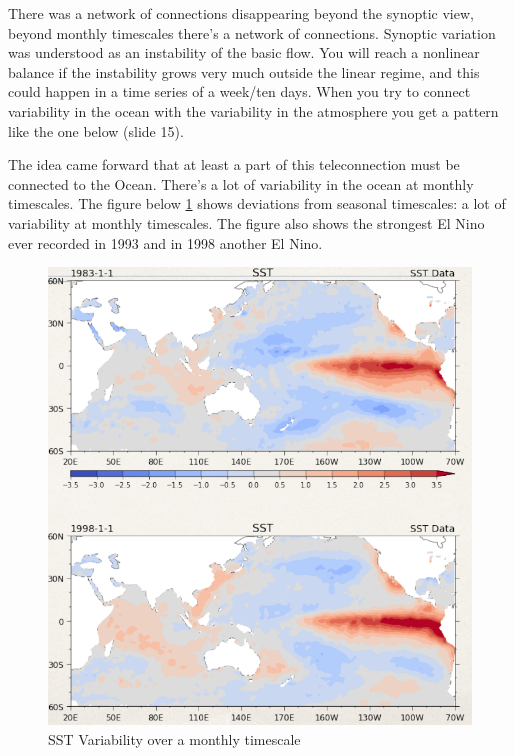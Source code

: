 There was a network of connections disappearing beyond the synoptic view, beyond monthly timescales there's a network of connections. Synoptic variation was understood as an instability of the basic flow. You will reach a nonlinear balance if the instability grows very much outside the linear regime, and this could happen in a time series of a week/ten days.
When you try to connect variability in the ocean with the variability in the atmosphere you get a pattern like the one below (slide 15).

The idea came forward that at least a part of this teleconnection must be connected to the Ocean. There's a lot of variability in the ocean at monthly timescales. The figure below \ref{fig:SST VAR} shows deviations from seasonal timescales: a lot of variability at monthly timescales. The figure also shows the strongest El Nino ever recorded in 1993 and in 1998 another El Nino.
\begin{figure}[htp!]
	\centering
	\includegraphics[width=0.4\linewidth]{uploads/Screenshot 2024-11-18 164612.png}
	\caption{SST Variability over a monthly timescale}
	\label{fig:SST VAR}
\end{figure}

